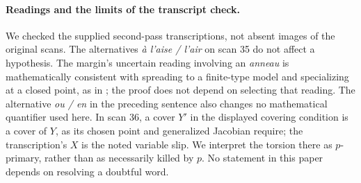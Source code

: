 \paragraph{Readings and the limits of the transcript check.}
We checked the supplied second-pass transcriptions, not absent
images of the original scans. The alternatives
\emph{à l'aise / l'air} on scan 35 do not affect a hypothesis.
The margin's uncertain reading involving an \emph{anneau} is
mathematically consistent with spreading to a finite-type model
and specializing at a closed point, as in ;
the proof does not depend on selecting that reading. The
alternative \emph{ou / en} in the preceding sentence also changes
no mathematical quantifier used here. In scan 36, a cover $Y'$
in the displayed covering condition is a cover of $Y$, as its
chosen point and generalized Jacobian require; the transcription's
$X$ is the noted variable slip. We interpret the torsion there
as $p$-primary, rather than as necessarily killed by $p$.
No statement in this paper depends on resolving a doubtful word.

